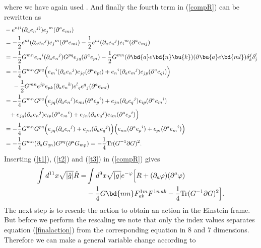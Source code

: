 where we have again used . And finally the fourth term in (\ref{compR}) can be rewritten as
\begin{align}
&-e^{n(i}({\partial}_a e{_n}^{j)})e{_j}^m(\partial^a e_{mi}) \nonumber \\
&= - {1 \over 2}e^{ni}({\partial}_a e{_n}^{j})e{_j}^m(\partial^a e_{mi})- {1 \over 2}e^{ni}({\partial}_a e{_n}^{j})e{_i}^m(\partial^a e_{mj})\nonumber \\
&=- {1 \over 2}G^{mn}e{_m}^{i}({\partial}_a e{_n}^{j})G^{pq}e_{jq}(\partial^a e_{pi})- {1 \over 2}G^{mn}({\partial}\bd{a} e\bd{n}\bu{k})(\partial\bu{a} e\bd{ml}){\delta}_{k}^j{\delta}_{j}^l \nonumber \\
&=- {1 \over 4}G^{mn}G^{pq} \Big{(}e{_m}^{i}({\partial}_a e{_n}^{j})e_{jq}(\partial^a e_{pi})+e{_n}^{i}({\partial}_a e{_m}^{j})e_{jp}(\partial^a e_{qi})\Big{)}\nonumber \\
&\hspace{0.47cm}-{1 \over 2}G^{mn}e^{jp}e_{pk}({\partial}_a e{_n}^{k})e{^l}_q e{^q}_j(\partial^a e_{ml})\nonumber \\
&= - {1 \over 4}G^{mn}G^{pq}\Big{(}e_{jq}({\partial}_a e{_n}^{j})e_{mi}(\partial^a e{_p}^i)+e_{jn}({\partial}_a e{_q}^{j})e_{ip}(\partial^a e{_m}^i)\nonumber \\
&\phantom{=}+e_{jq}({\partial}_a e{_n}^{j})e_{ip}(\partial^a e{_m}^i)+e_{jn}({\partial}_a e{_q}^{j})e_{im}(\partial^a e{_p}^i)\Big{)}\nonumber \\
&=-{1 \over 4}G^{mn}G^{pq}\Big{(}e_{jq}({\partial}_a e{_n}^j)+e_{jn}({\partial}_a e{_q}^j)\Big{)}\Big{(}e_{mi}(\partial^a e{_p}^i)+e_{pi}(\partial^a e{_m}^i)\Big{)}\nonumber \\
&=-{1 \over 4}G^{mn}({\partial}_a G_{qn})G^{pq}(\partial^a G_{mp})=-{1 \over 4}\mbox{Tr}(G^{-1} \partial G)^2.
\label{t3}
\end{align}
Inserting (\ref{t1}), (\ref{t2}) and (\ref{t3}) in (\ref{compR}) gives
\begin{align}
\int d^{11}x \sqrt{|\hat{g}|} \hat{R} =& \int d^9x \sqrt{|g|} e^{-\varphi}\Big{[}R + ({\partial}_a \varphi) ({\partial}^a \varphi) \nonumber \\
&-{1 \over 4}G\bd{mn}F_{ab}^{1m}F^{1n \hspace{0.05cm} ab} - {1 \over 4} \mbox{Tr}(G^{-1}\partial G)^2\Big{]}.
\label{finalaction}
\end{align}
The next step is to rescale the action to obtain an action in the Einstein frame. But before we perform the rescaling we note that only the index values 
separates equation (\ref{finalaction}) from the corresponding equation in 8 and 7 dimensions. Therefore we can make a general variable change according to
